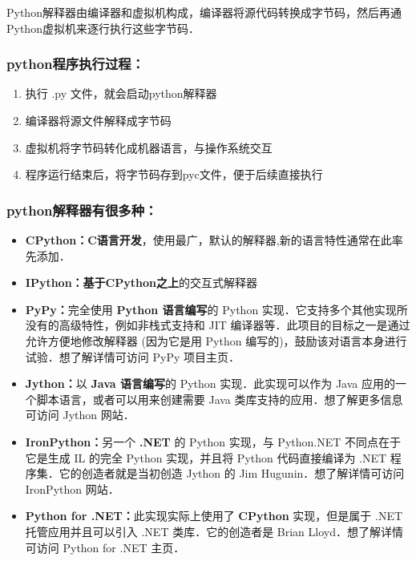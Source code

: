 
\begin{issues}
\issueTODO
\end{issues}


Python解释器由编译器和虚拟机构成，编译器将源代码转换成字节码，然后再通Python虚拟机来逐行执行这些字节码．

\subsubsection{python程序执行过程：}

\begin{enumerate}
\item 执行 .py 文件，就会启动python解释器

\item 编译器将源文件解释成字节码

\item 虚拟机将字节码转化成机器语言，与操作系统交互

\item 程序运行结束后，将字节码存到pyc文件，便于后续直接执行
\end{enumerate}

\subsubsection{python解释器有很多种：}

\begin{itemize}
\item \textbf{CPython：}\textbf{C语言开发}，使用最广，默认的解释器,新的语言特性通常在此率先添加．

\item \textbf{IPython：}\textbf{基于CPython之上}的交互式解释器

\item \textbf{PyPy：}完全使用 \textbf{Python 语言编写}的 Python 实现．它支持多个其他实现所没有的高级特性，例如非栈式支持和 JIT 编译器等．此项目的目标之一是通过允许方便地修改解释器 (因为它是用 Python 编写的)，鼓励该对语言本身进行试验．想了解详情可访问 PyPy 项目主页．

\item \textbf{Jython：}以 \textbf{Java 语言编写}的 Python 实现．此实现可以作为 Java 应用的一个脚本语言，或者可以用来创建需要 Java 类库支持的应用．想了解更多信息可访问 Jython 网站．

\item \textbf{IronPython：}另一个 \textbf{.NET} 的 Python 实现，与 Python.NET 不同点在于它是生成 IL 的完全 Python 实现，并且将 Python 代码直接编译为 .NET 程序集．它的创造者就是当初创造 Jython 的 Jim Hugunin．想了解详情可访问 IronPython 网站．

\item \textbf{Python for .NET：}此实现实际上使用了 \textbf{CPython} 实现，但是属于 .NET 托管应用并且可以引入 .NET 类库．它的创造者是 Brian Lloyd．想了解详情可访问 Python for .NET 主页．
\end{itemize}